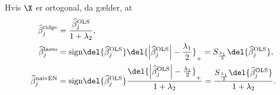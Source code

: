 \begin{lem}
Hvis \(\X\) er ortogonal, da gælder, at
\begin{align}
\widehat{\beta}_j^\text{ridge} &= \frac{\widehat{\beta}_j^\text{OLS}}{1+\lambda_2}, \label{eq:orto_ridge} \\
\widehat{\beta}_j^\text{lasso} &= \text{sign} \del{\widehat{\beta}_j^\text{OLS}} \del{\left\vert \widehat{\beta}_j^\text{OLS} \right\vert - \frac{\lambda_1}{2}}_+ =S_{\frac{\lambda_1}{2}} \del{ \widehat{\beta}_j^\text{OLS}}, \label{eq:orto_lasso} \\
\widehat{\beta}_j^\text{naivEN} &= \text{sign} \del{\widehat{\beta}_j^\text{OLS}} \frac{\del{\left\vert \widehat{\beta}_j^\text{OLS} \right\vert - \frac{\lambda_1}{2}}_+}{1+\lambda_2} = \frac{S_{\frac{\lambda_1}{2}} \del{ \widehat{\beta}_j^\text{OLS}} }{1+\lambda_2} . \label{eq:orto_naivEN}
\end{align}
\end{lem}
%
